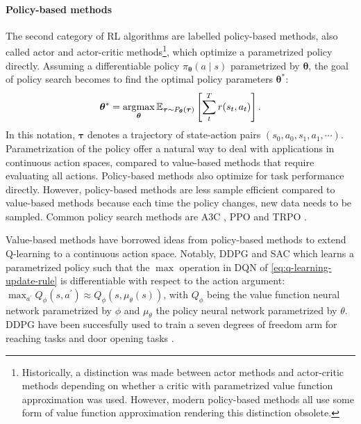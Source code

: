\documentclass[\home/main.tex]{subfiles}
\begin{document}
\paragraph{Policy-based methods}
The second category of RL algorithms are labelled policy-based methods, also called actor and actor-critic methods\footnote{Historically, a distinction was made between actor methods and actor-critic methods depending on whether a critic with parametrized value function approximation was used. However, modern policy-based methods all use some form of value function approximation rendering this distinction obsolete.}, which optimize a parametrized policy directly. Assuming a differentiable policy $\pi_{\boldsymbol{\theta}}(a \mid s)$ parametrized by $\boldsymbol{\theta}$, the goal of policy search becomes to find the optimal policy parameters $\boldsymbol{\theta}^{*}$:
\begin{equation} \label{eq:policy-max}
	\boldsymbol{\theta}^{*} = \operatorname*{\arg\!\max}_{\boldsymbol{\theta}} \mathbb{E}_{\boldsymbol{\tau} \sim P_{\boldsymbol{\theta}}(\boldsymbol{\tau}) } \left[ \sum_{t}^{T} r(s_t, a_t) \right].
\end{equation}
In this notation, $\boldsymbol{\tau}$ denotes a trajectory of state-action pairs $(s_0, a_0, s_1, a_1, \cdots)$. Parametrization of the policy offer a natural way to deal with applications in continuous action spaces, compared to value-based methods that require evaluating all actions. Policy-based methods also optimize for task performance directly. However, policy-based methods are less sample efficient compared to value-based methods because each time the policy changes, new data needs to be sampled. Common policy search methods are A3C \autocite{mnih2016asynchronous}, PPO \autocite{schulman2017proximal} and TRPO \autocite{schulman2015trust}.

Value-based methods have borrowed ideas from policy-based methods to extend Q-learning to a continuous action space. Notably, DDPG \autocite{lillicrap2015continuous} and SAC \autocite{haarnoja2018soft} which learns a parametrized policy such that the $\max$ operation in \gls{DQN} of \cref{eq:q-learning-update-rule} is differentiable with respect to the action argument: $\max_{a^{\prime}} Q_{\phi}(s, a^{\prime}) \approx Q_{\phi} (s, \mu_{\theta}(s))$, with $Q_{\phi}$ being the value function neural network parametrized by $\phi$ and $\mu_{\theta}$ the policy neural network parametrized by $\theta$. DDPG have been succesfully used to  train a seven degrees of freedom arm for reaching tasks and door opening tasks \autocite{gu2017deep}.
\end{document}
